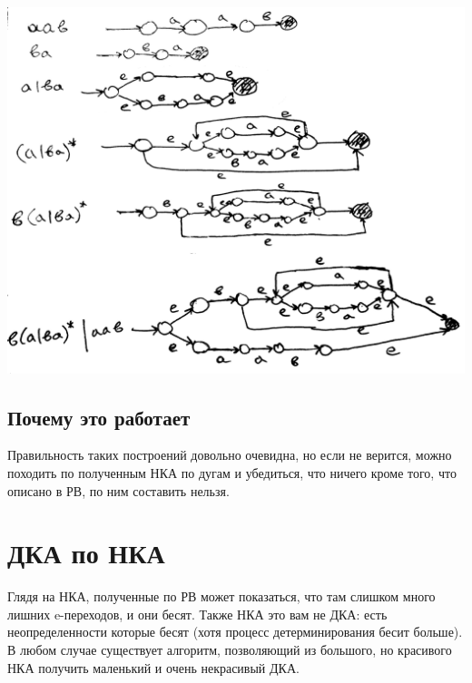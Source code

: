 \documentclass[14pt]{extreport}
\begin{document}
	\includegraphics[scale=0.15]{data/pic1_2.png}\\
	\section{Почему это работает}
	Правильность таких построений довольно очевидна, но если не верится, можно походить по
	полученным НКА по дугам и убедиться, что ничего кроме того, что описано в РВ, по ним
	составить нельзя.
	\newpage
	
	\chapter{ДКА по НКА}
	Глядя на НКА, полученные по РВ может показаться, что там слишком много лишних e-переходов,
	и они бесят. Также НКА это вам не ДКА: есть неопределенности которые бесят (хотя процесс
	детерминирования бесит больше). В любом случае существует алгоритм, позволяющий из большого,
	но красивого НКА получить маленький и очень некрасивый ДКА.
\end{document}

